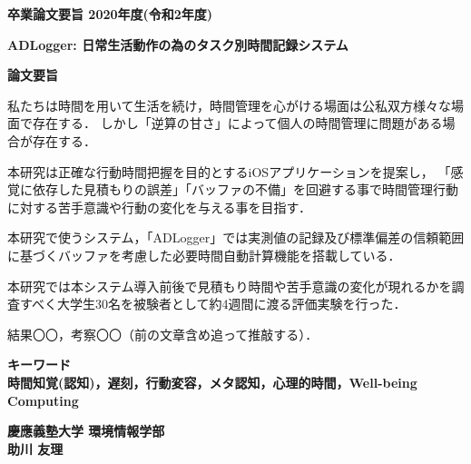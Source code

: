 \begin{center}
\textbf{\Large 卒業論文要旨 2020年度(令和2年度)}

\vspace{6.18mm}

\textbf{\Large ADLogger: 日常生活動作の為のタスク別時間記録システム}
\end{center}

\vspace{10mm}

\begin{flushleft}
\textbf{論文要旨}\\
\end{flushleft}

私たちは時間を用いて生活を続け，時間管理を心がける場面は公私双方様々な場面で存在する．
しかし「逆算の甘さ」によって個人の時間管理に問題がある場合が存在する．

本研究は正確な行動時間把握を目的とするiOSアプリケーションを提案し，
「感覚に依存した見積もりの誤差」「バッファの不備」を回避する事で時間管理行動に対する苦手意識や行動の変化を与える事を目指す．

本研究で使うシステム，「ADLogger」では実測値の記録及び標準偏差の信頼範囲に基づくバッファを考慮した必要時間自動計算機能を搭載している．

本研究では本システム導入前後で見積もり時間や苦手意識の変化が現れるかを調査すべく大学生30名を被験者として約4週間に渡る評価実験を行った．

結果〇〇，考察〇〇（前の文章含め追って推敲する）．

\begin{flushleft}
\textbf{キーワード}\\
\textbf{時間知覚(認知)，遅刻，行動変容，メタ認知，心理的時間，Well-being Computing}

\end{flushleft}

\begin{flushright}
\textbf{慶應義塾大学 環境情報学部}\\
\textbf{助川 友理}
\end{flushright}
\newpage

